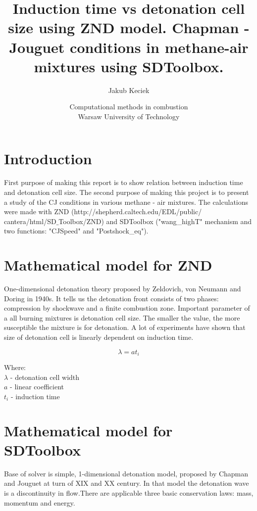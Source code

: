 \documentclass[11pt,a4paper]{article}
\title{Induction time vs detonation cell size using ZND model. Chapman - Jouguet conditions in methane-air mixtures using SDToolbox.}
\author{Jakub Keciek}
\date{Computational methods in combustion\\
Warsaw University of Technology}
\begin{document}
\maketitle

\clearpage
\tableofcontents
\clearpage
\section{Introduction}\label{sec:intro}
First purpose of making this report is to show relation between induction time and detonation cell size. The second purpose of making this project is to present a study of the CJ conditions in various methane - air mixtures. The calculations were made with ZND 
(http://shepherd.caltech.edu/EDL/public/\\
cantera/html/SD$\_$Toolbox/ZND) and SDToolbox ("wang\_highT" mechanism and two functions: "CJSpeed" and "Postshock\_eq").

\section{Mathematical model for ZND}\label{sec:model}
One-dimensional detonation theory proposed by Zeldovich, von Neumann and Doring in 1940s. It tells us the detonation front consists of two phases: compression by shockwave and a finite combustion zone.
Important parameter of a all burning mixtures is detonation cell size. The smaller the value, the more susceptible the mixture is for detonation. A lot of experiments have shown that size of detonation cell is linearly dependent on induction time.

\begin{equation}
    \lambda = a t_i
\end{equation}


Where:\\
$\lambda$ - detonation cell width\\
$a$ - linear coefficient\\
$t_i$ - induction time\\ 


\section{Mathematical model for SDToolbox}\label{sec:model}
Base of solver is simple, 1-dimensional detonation model, proposed by Chapman and Jouguet at turn of XIX and XX century. In that model the detonation wave is a discontinuity in flow.There are applicable three basic conservation laws: mass, momentum and energy.
\end{document}
